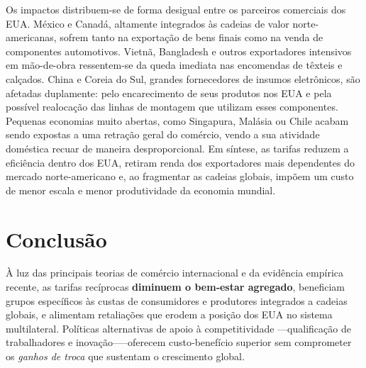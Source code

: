 \documentclass[a4paper,12pt]{article}[abntex2]
\begin{document}
Os impactos distribuem-se de forma desigual entre os parceiros comerciais dos EUA. México e Canadá, altamente integrados às cadeias de valor norte-americanas, sofrem tanto na exportação de bens finais como na venda de componentes automotivos. Vietnã, Bangladesh e outros exportadores intensivos em mão-de-obra ressentem-se da queda imediata nas encomendas de têxteis e calçados. China e Coreia do Sul, grandes fornecedores de insumos eletrônicos, são afetadas duplamente: pelo encarecimento de seus produtos nos EUA e pela possível realocação das linhas de montagem que utilizam esses componentes. Pequenas economias muito abertas, como Singapura, Malásia ou Chile acabam sendo expostas a uma retração geral do comércio, vendo a sua atividade doméstica recuar de maneira desproporcional. Em síntese, as tarifas reduzem a eficiência dentro dos EUA, retiram renda dos exportadores mais dependentes do mercado norte-americano e, ao fragmentar as cadeias globais, impõem um custo de menor escala e menor produtividade da economia mundial.

\section*{\textbf{Conclusão}}
À luz das principais teorias de comércio internacional e da evidência empírica recente, as tarifas recíprocas \textbf{diminuem o bem‑estar agregado}, beneficiam grupos específicos às custas de consumidores e produtores integrados a cadeias globais, e alimentam retaliações que erodem a posição dos EUA no sistema multilateral. Políticas alternativas de apoio à competitividade ––qualificação de trabalhadores e inovação–—oferecem custo‑benefício superior sem comprometer os \textit{ganhos de troca} que sustentam o crescimento global.
\end{document}

